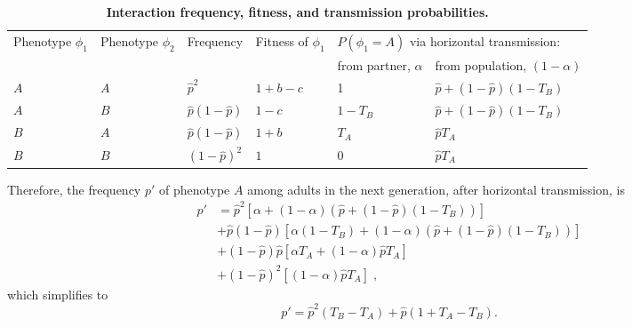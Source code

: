 \documentclass[12pt]{extarticle}
\begin{document}
\bigskip
\begin{table}[]
\begin{tabular}{@{}llllll@{}}
\toprule
\multirow{2}{*}{Phenotype $\phi_1$} &
  \multirow{2}{*}{Phenotype $\phi_2$} &
  \multirow{2}{*}{Frequency} &
  \multirow{2}{*}{Fitness of $\phi_1$} &
  \multicolumn{2}{l}{$P(\phi_1=A)$ via horizontal transmission:} \\ \cmidrule(l){5-6} 
    &     &                      &         & from partner, $\alpha$ & from population, $(1-\alpha)$ \\ \cmidrule(r){1-6}
$A$ & $A$ & $\hat{p}^2$          & $1+b-c$ & 1                      & $\hat{p}+(1-\hat{p})(1-T_B)$  \\
$A$ & $B$ & $\hat{p}(1-\hat{p})$ & $1-c$   & $1-T_B$                & $\hat{p}+(1-\hat{p})(1-T_B)$  \\
$B$ & $A$ & $\hat{p}(1-\hat{p})$ & $1+b$   & $T_A$                  & $\hat{p} T_A$                 \\
$B$ & $B$ & $(1-\hat{p})^2$      & $1$     & $0$                    & $\hat{p} T_A$                 \\ \bottomrule
\end{tabular}
\caption{\textbf{Interaction frequency, fitness, and transmission probabilities.}}
\label{table:interactions}
\end{table}
\bigskip

Therefore, the frequency $p'$ of phenotype $A$ among adults in the next generation, after horizontal transmission, is 
\begin{equation}\label{eq:nextgen_adults}
\begin{aligned}
p'
& = \hat{p}^2 [\alpha + (1-\alpha)(\hat{p} + (1-\hat{p})(1-T_B))] \\
& + \hat{p}(1-\hat{p}) [\alpha(1-T_B) + (1-\alpha)(\hat{p} + (1-\hat{p})(1-T_B))] \\
& + (1-\hat{p})\hat{p} [\alpha T_A + (1-\alpha) \hat{p} T_A ] \\
& + (1-\hat{p})^2 [(1-\alpha) \hat{p} T_A] \;,
\end{aligned}
\end{equation}
which simplifies to
\begin{equation}\label{eq:nextgen_adults_slimpify}
p' = \hat{p}^2(T_B-T_A) + \hat{p}(1+T_A-T_B) .
\end{equation}
\end{document}
